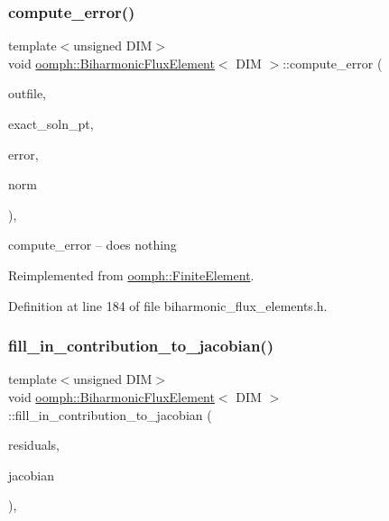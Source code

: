 \subsubsection{\texorpdfstring{compute\+\_\+error()}{compute\_error()}}
{\footnotesize\ttfamily template$<$unsigned D\+IM$>$ \\
void \hyperlink{classoomph_1_1BiharmonicFluxElement}{oomph\+::\+Biharmonic\+Flux\+Element}$<$ D\+IM $>$\+::compute\+\_\+error (\begin{DoxyParamCaption}\item[{std\+::ostream \&}]{outfile,  }\item[{\hyperlink{classoomph_1_1FiniteElement_a690fd33af26cc3e84f39bba6d5a85202}{Finite\+Element\+::\+Steady\+Exact\+Solution\+Fct\+Pt}}]{exact\+\_\+soln\+\_\+pt,  }\item[{double \&}]{error,  }\item[{double \&}]{norm }\end{DoxyParamCaption})\hspace{0.3cm}{\ttfamily [inline]}, {\ttfamily [virtual]}}



compute\+\_\+error -- does nothing 



Reimplemented from \hyperlink{classoomph_1_1FiniteElement_a73c79a1f1e5b1d334757812a6bbd58ff}{oomph\+::\+Finite\+Element}.



Definition at line 184 of file biharmonic\+\_\+flux\+\_\+elements.\+h.

\mbox{\label{classoomph_1_1BiharmonicFluxElement_a2d9f3025aa3d9e941a95e2d2ca7f86ce}} 
\subsubsection{\texorpdfstring{fill\+\_\+in\+\_\+contribution\+\_\+to\+\_\+jacobian()}{fill\_in\_contribution\_to\_jacobian()}}
{\footnotesize\ttfamily template$<$unsigned D\+IM$>$ \\
void \hyperlink{classoomph_1_1BiharmonicFluxElement}{oomph\+::\+Biharmonic\+Flux\+Element}$<$ D\+IM $>$\+::fill\+\_\+in\+\_\+contribution\+\_\+to\+\_\+jacobian (\begin{DoxyParamCaption}\item[{\hyperlink{classoomph_1_1Vector}{Vector}$<$ double $>$ \&}]{residuals,  }\item[{\hyperlink{classoomph_1_1DenseMatrix}{Dense\+Matrix}$<$ double $>$ \&}]{jacobian }\end{DoxyParamCaption})\hspace{0.3cm}{\ttfamily [inline]}, {\ttfamily [virtual]}}



